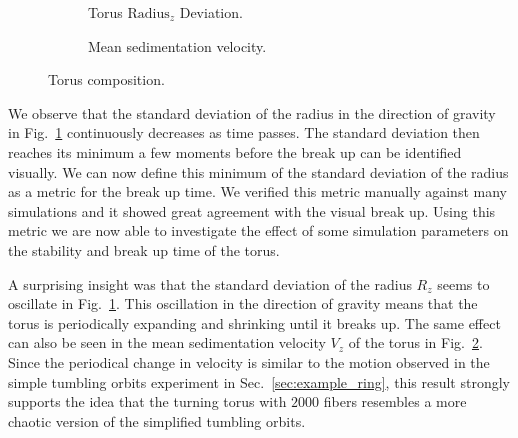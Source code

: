 \begin{figure}[!htbp]
\begin{subfigure}[h]{.48\textwidth}
    \caption{Torus $\text{Radius}_z$ Deviation.}\label{fig:torus_deviation}
  \end{subfigure}
  \begin{subfigure}[h]{.48\textwidth}
    \caption{Mean sedimentation velocity.}\label{fig:torus_velocity}
  \end{subfigure}
  \caption{Torus composition.}
  \label{fig:torus}
\end{figure}

We observe that the standard deviation of the radius in the direction of gravity in Fig.~\ref{fig:torus_deviation} continuously decreases as time passes. The standard deviation then reaches its minimum a few moments before the break up can be identified visually. We can now define this minimum of the standard deviation of the radius as a metric for the break up time. We verified this metric manually against many simulations and it showed great agreement with the visual break up. Using this metric we are now able to investigate the effect of some simulation parameters on the stability and break up time of the torus.

A surprising insight was that the standard deviation of the radius $R_z$ seems to oscillate in Fig.~\ref{fig:torus_deviation}. This oscillation in the direction of gravity means that the torus is periodically expanding and shrinking until it breaks up. The same effect can also be seen in the mean sedimentation velocity $V_z$ of the torus in Fig.~\ref{fig:torus_velocity}. Since the periodical change in velocity is similar to the motion observed in the simple tumbling orbits experiment in Sec.~\ref{sec:example_ring},  this result strongly supports the idea that the turning torus with $2000$ fibers resembles a more chaotic version of the simplified tumbling orbits.

